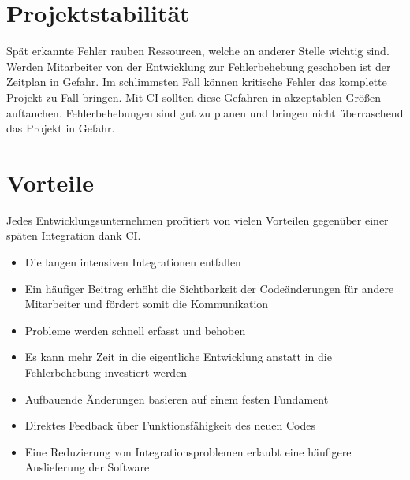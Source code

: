 \section{Projektstabilität}
Spät erkannte Fehler rauben Ressourcen, welche an anderer Stelle wichtig sind. Werden Mitarbeiter von der Entwicklung zur Fehlerbehebung geschoben ist der Zeitplan in Gefahr. Im schlimmsten Fall können kritische Fehler das komplette Projekt zu Fall bringen. Mit CI sollten diese Gefahren in akzeptablen Größen auftauchen. Fehlerbehebungen sind gut zu planen und bringen nicht überraschend das Projekt in Gefahr. 

\section{Vorteile}
Jedes Entwicklungsunternehmen profitiert von vielen Vorteilen gegenüber einer späten Integration dank CI.
\begin{itemize}
	\item Die langen intensiven Integrationen entfallen
	\item Ein häufiger Beitrag erhöht die Sichtbarkeit der Codeänderungen für andere Mitarbeiter und fördert somit die Kommunikation
	\item  Probleme werden schnell erfasst und behoben
	\item Es kann mehr Zeit in die eigentliche Entwicklung anstatt in die Fehlerbehebung investiert werden
	\item Aufbauende Änderungen basieren auf einem festen Fundament
	\item Direktes Feedback über Funktionsfähigkeit des neuen Codes
	\item Eine Reduzierung von Integrationsproblemen erlaubt eine häufigere Auslieferung der Software
\end{itemize}